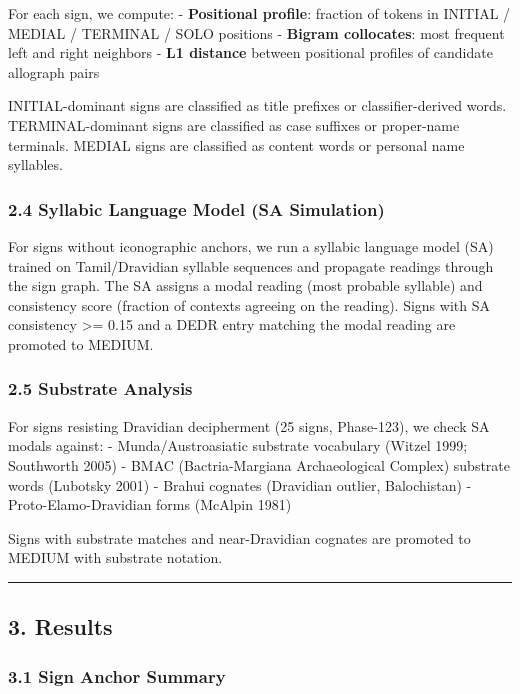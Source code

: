 \documentclass[
]{article}
\begin{document}
For each sign, we compute: - \textbf{Positional profile}: fraction of
tokens in INITIAL / MEDIAL / TERMINAL / SOLO positions - \textbf{Bigram
collocates}: most frequent left and right neighbors - \textbf{L1
distance} between positional profiles of candidate allograph pairs

INITIAL-dominant signs are classified as title prefixes or
classifier-derived words. TERMINAL-dominant signs are classified as case
suffixes or proper-name terminals. MEDIAL signs are classified as
content words or personal name syllables.

\subsubsection{2.4 Syllabic Language Model (SA
Simulation)}\label{syllabic-language-model-sa-simulation}

For signs without iconographic anchors, we run a syllabic language model
(SA) trained on Tamil/Dravidian syllable sequences and propagate
readings through the sign graph. The SA assigns a modal reading (most
probable syllable) and consistency score (fraction of contexts agreeing
on the reading). Signs with SA consistency \textgreater{}= 0.15 and a DEDR entry
matching the modal reading are promoted to MEDIUM.

\subsubsection{2.5 Substrate Analysis}\label{substrate-analysis}

For signs resisting Dravidian decipherment (25 signs, Phase-123), we
check SA modals against: - Munda/Austroasiatic substrate vocabulary
(Witzel 1999; Southworth 2005) - BMAC (Bactria-Margiana Archaeological
Complex) substrate words (Lubotsky 2001) - Brahui cognates (Dravidian
outlier, Balochistan) - Proto-Elamo-Dravidian forms (McAlpin 1981)

Signs with substrate matches and near-Dravidian cognates are promoted to
MEDIUM with substrate notation.

\begin{center}\rule{0.5\linewidth}{0.5pt}\end{center}

\subsection{3. Results}\label{results}

\subsubsection{3.1 Sign Anchor Summary}\label{sign-anchor-summary}
\end{document}
